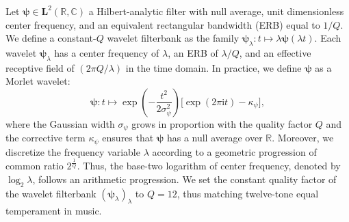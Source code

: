 \documentclass{bmcart}
\begin{document}
Let $\boldsymbol{\psi} \in \mathbf{L}^2(\mathbb{R}, \mathbb{C})$ a Hilbert-analytic filter with null average, unit dimensionless center frequency, and an equivalent rectangular bandwidth (ERB) equal to $1/Q$.
We define a constant-$Q$ wavelet filterbank as the family $\boldsymbol{\psi}_{\lambda} : t \mapsto \lambda \boldsymbol{\psi}(\lambda t)$.
Each wavelet $\boldsymbol{\psi}_{\lambda}$ has a center frequency of $\lambda$, an ERB of $\lambda/Q$, and an effective receptive field of $(2\pi Q/\lambda)$ in the time domain.
In practice, we define $\boldsymbol{\psi}$ as a Morlet wavelet:
\begin{equation}
\boldsymbol{\psi}:t \longmapsto \exp\left(-\dfrac{t^2}{2\sigma_{\psi}^2}\right) 
\big[ \exp\left(2\pi \mathrm{i}t\right) - \kappa_{\psi} \big],
\label{eq:psi}
\end{equation}
where the Gaussian width $\sigma_{\psi}$ grows in proportion with the quality factor $Q$ and the corrective term $\kappa_{\psi}$ ensures that $\boldsymbol{\psi}$ has a null average over $\mathbb{R}$.
Moreover, we discretize the frequency variable $\lambda$ according to a geometric progression of common ratio $2^{\frac{1}{Q}}$.
Thus, the base-two logarithm of center frequency, denoted by $\log_2 \lambda$, follows an arithmetic progression.
We set the constant quality factor of the wavelet filterbank $(\boldsymbol{\psi}_\lambda)_\lambda$ to $Q=12$, thus matching twelve-tone equal temperament in music.
\end{document}
